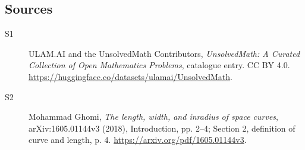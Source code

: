 \documentclass[11pt]{article}
\begin{document}
\subsection{Sources}
\begin{description}
\item[\hypertarget{source:statement:1}{S1}] ULAM.AI and the UnsolvedMath Contributors, \emph{UnsolvedMath: A Curated Collection of Open Mathematics Problems}, catalogue entry. CC BY 4.0. \url{https://huggingface.co/datasets/ulamai/UnsolvedMath}.
\item[\hypertarget{source:statement:2}{S2}] Mohammad Ghomi, \emph{The length, width, and inradius of space curves}, arXiv:1605.01144v3 (2018), Introduction, pp. 2--4; Section 2, definition of curve and length, p. 4. \url{https://arxiv.org/pdf/1605.01144v3}.
\end{description}
\label{end:statement}
\end{document}
